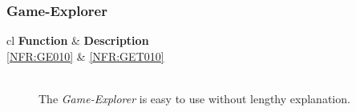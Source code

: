 
\subsubsection{Game-Explorer}
\begin{tabular}{{c}{l}}
    \hline
    \textbf{Function} & \textbf{Description} \\ \hline
	\ref{NFR:GE010} & \ref{NFR:GET010} \\ \hline
\end{tabular}

\vspace{.5cm}

\begin{description}
	\item[] \textbf{}  \\
	The \emph{Game-Explorer} is easy to use without lengthy explanation.
\end{description}
